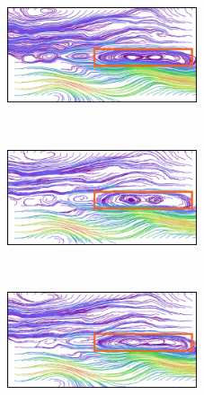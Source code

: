 \begin{figure}[!htb]
  \centering
  \begin{subfigure}[!htb]{0.32\textwidth}
    \centering
    \includegraphics[width=2.2in]{../figures/ocean_gt.eps}
    \caption{}
  \end{subfigure}~
  \begin{subfigure}[!htb]{0.32\textwidth}
    \centering
    \includegraphics[width=2.2in]{../figures/ocean_mc.eps}
    \caption{}
  \end{subfigure}~
  \begin{subfigure}[!htb]{0.32\textwidth}
    \centering
    \includegraphics[width=2.2in]{../figures/ocean_smc.eps}
    \caption{}
  \end{subfigure}


\end{figure}
